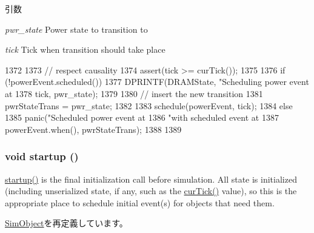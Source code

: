 \begin{DoxyParams}{引数}
\item[{\em pwr\_\-state}]Power state to transition to \item[{\em tick}]Tick when transition should take place \end{DoxyParams}



\begin{DoxyCode}
1372 {
1373     // respect causality
1374     assert(tick >= curTick());
1375 
1376     if (!powerEvent.scheduled()) {
1377         DPRINTF(DRAMState, "Scheduling power event at %
1378                 tick, pwr_state);
1379 
1380         // insert the new transition
1381         pwrStateTrans = pwr_state;
1382 
1383         schedule(powerEvent, tick);
1384     } else {
1385         panic("Scheduled power event at %
1386               "with scheduled event at %
1387               powerEvent.when(), pwrStateTrans);
1388     }
1389 }
\end{DoxyCode}
\hypertarget{classDRAMCtrl_aecc7d8debf54990ffeaaed5bac7d7d81}{
\subsubsection[{startup}]{\setlength{\rightskip}{0pt plus 5cm}void startup ()}}
\label{classDRAMCtrl_aecc7d8debf54990ffeaaed5bac7d7d81}
\hyperlink{classDRAMCtrl_aecc7d8debf54990ffeaaed5bac7d7d81}{startup()} is the final initialization call before simulation. All state is initialized (including unserialized state, if any, such as the \hyperlink{statistics_8hh_a7acdccbf0d35ce0c159c0cdd36371b22}{curTick()} value), so this is the appropriate place to schedule initial event(s) for objects that need them. 

\hyperlink{classSimObject_aecc7d8debf54990ffeaaed5bac7d7d81}{SimObject}を再定義しています。


